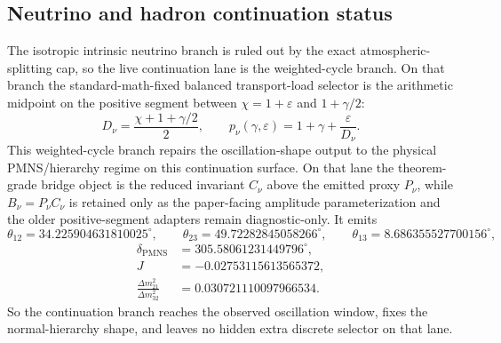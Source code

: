 \documentclass[11pt]{article}
\begin{document}
\subsection{Neutrino and hadron continuation status}

The isotropic intrinsic neutrino branch is ruled out by the exact atmospheric-splitting cap, so the live continuation lane is the weighted-cycle branch. On that branch the standard-math-fixed balanced transport-load selector is the arithmetic midpoint on the positive segment between \(\chi=1+\varepsilon\) and \(1+\gamma/2\):
\[
D_\nu=\frac{\chi+1+\gamma/2}{2},
\qquad
p_\nu(\gamma,\varepsilon)=1+\gamma+\frac{\varepsilon}{D_\nu}.
\]
This weighted-cycle branch repairs the oscillation-shape output to the physical PMNS/hierarchy regime on this continuation surface. On that lane the theorem-grade bridge object is the reduced invariant \(C_\nu\) above the emitted proxy \(P_\nu\), while \(B_\nu=P_\nu C_\nu\) is retained only as the paper-facing amplitude parameterization and the older positive-segment adapters remain diagnostic-only. It emits
\[
\theta_{12}=34.225904631810025^\circ,\qquad
\theta_{23}=49.72282845058266^\circ,\qquad
\theta_{13}=8.686355527700156^\circ,
\]
\[
\begin{aligned}
\delta_{\mathrm{PMNS}}&=305.58061231449796^\circ,\\
J&=-0.02753115613565372,\\
\frac{\Delta m_{21}^2}{\Delta m_{32}^2}&=0.030721110097966534.
\end{aligned}
\]
So the continuation branch reaches the observed oscillation window, fixes the normal-hierarchy shape, and leaves no hidden extra discrete selector on that lane.
\end{document}
